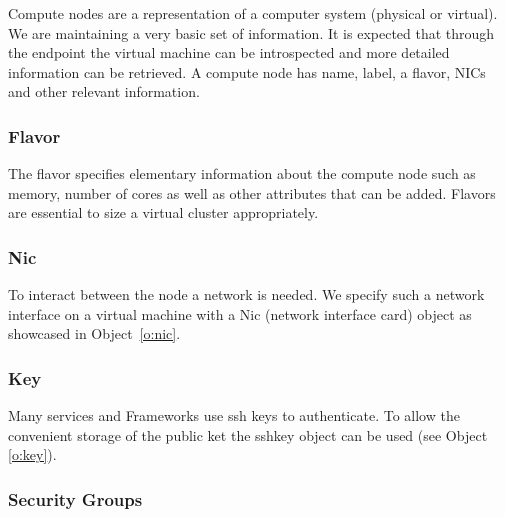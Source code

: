 \documentclass[10pt]{article}
\begin{document}
Compute nodes are a representation of a computer system (physical or
virtual). We are maintaining a very basic set of information. It is
expected that through the endpoint the virtual machine can be
introspected and more detailed information can be retrieved. A compute
node has name, label, a flavor, NICs and other relevant information.



\subsubsection{Flavor}

The flavor specifies elementary information about the compute node
such as memory, number of cores as well as other attributes that can
be added. Flavors are essential to size a virtual cluster appropriately.



%
%
%
%

\subsubsection{Nic}

To interact between the node a network is needed. We specify such a
network interface on a virtual machine with a Nic (network interface
card) object as showcased in Object~\ref{o:nic}. 


\subsubsection{Key}

Many services and Frameworks use ssh keys to authenticate. To allow
the convenient storage of the public ket the sshkey object can be
used (see Object \ref{o:key}).


\subsubsection{Security Groups}
\end{document}
